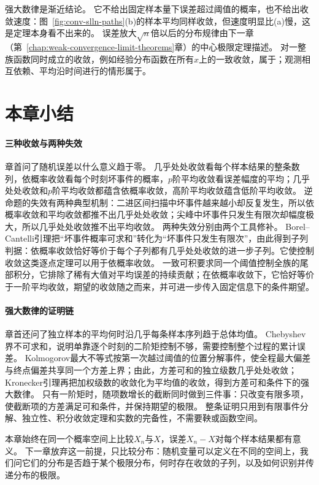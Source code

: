 强大数律是渐近结论。
它不给出固定样本量下误差超过阈值的概率，也不给出收敛速度：图~\ref{fig:conv-slln-paths}(b)的样本平均同样收敛，但速度明显比(a)慢，这是定理本身看不出来的。
误差放大$\sqrt n$倍以后的分布规律由下一章（第~\ref{chap:weak-convergence-limit-theorems}章）的中心极限定理描述。
对一整族函数同时成立的收敛，例如经验分布函数在所有$x$上的一致收敛，属于；观测相互依赖、平均沿时间进行的情形属于。

\section{本章小结}
\label{sec:conv-summary}

\paragraph{三种收敛与两种失效}
章首问了随机误差以什么意义趋于零。
几乎处处收敛看每个样本结果的整条数列，依概率收敛看每个时刻坏事件的概率，$p$阶平均收敛看误差幅度的平均；几乎处处收敛和$p$阶平均收敛都蕴含依概率收敛，高阶平均收敛蕴含低阶平均收敛。
逆命题的失效有两种典型机制：二进区间扫描中坏事件越来越小却反复发生，所以依概率收敛和平均收敛都推不出几乎处处收敛；尖峰中坏事件只发生有限次却幅度极大，所以几乎处处收敛推不出平均收敛。
两种失效分别由两个工具修补。
Borel--Cantelli引理把“坏事件概率可求和”转化为“坏事件只发生有限次”，由此得到子列判据：依概率收敛恰好等价于每个子列都有几乎处处收敛的进一步子列。它使控制收敛这类逐点定理可以用于依概率收敛。
一致可积要求同一个阈值控制全族的尾部积分，它排除了稀有大值对平均误差的持续贡献；在依概率收敛下，它恰好等价于一阶平均收敛，期望的收敛随之而来，并可进一步传入固定信息下的条件期望。

\paragraph{强大数律的证明链}
章首还问了独立样本的平均何时沿几乎每条样本序列趋于总体均值。
Chebyshev界不可求和，说明单靠逐个时刻的二阶矩控制不够，需要控制整个过程的累计误差。
Kolmogorov最大不等式按第一次越过阈值的位置分解事件，使全程最大偏差与终点偏差共享同一个方差上界；由此，方差可和的独立级数几乎处处收敛；Kronecker引理再把加权级数的收敛化为平均值的收敛，得到方差可和条件下的强大数律。
只有一阶矩时，随项数增长的截断同时做到三件事：只改变有限多项，使截断项的方差满足可和条件，并保持期望的极限。
整条证明只用到有限事件分解、独立性、积分收敛定理和实数的完备性，不需要鞅或函数空间。

本章始终在同一个概率空间上比较$X_n$与$X$，误差$X_n-X$对每个样本结果都有意义。
下一章放弃这一前提，只比较分布：随机变量可以定义在不同的空间上，我们问它们的分布是否趋于某个极限分布，何时存在收敛的子列，以及如何识别并传递分布的极限。
